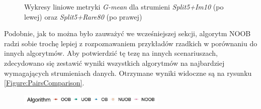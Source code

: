 \begin{figure}[h]
    \centering
    \qquad
    \caption{Wykresy liniowe metryki \textit{G-mean} dla strumieni \textit{Split5+Im10} (po lewej) oraz \textit{Split5+Rare80} (po prawej)}\label{Figure:Split5Pairs}
\end{figure}

\noindent Podobnie, jak to można było zauważyć we wcześniejszej sekcji, algorytm NOOB radzi sobie trochę lepiej z rozpoznawaniem przykładów rzadkich w porównaniu do innych algorytmów. Aby potwierdzić tę tezę na innych scenariuszach, zdecydowano się zestawić wyniki wszystkich algorytmów na najbardziej wymagających strumieniach danych. Otrzymane wyniki widoczne są na rysunku \ref{Figure:PairsComparison}.

\newpage

\begin{figure}[h]
    \centering
    \includegraphics[width=7cm]{figures/algorithms_legend.JPG}
\end{figure}

\vspace{-1.2cm}

